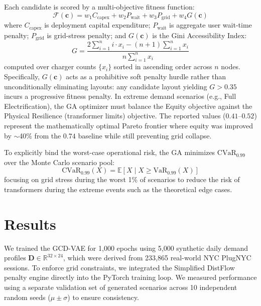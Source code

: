\documentclass[conference]{IEEEtran}
\begin{document}
Each candidate is scored by a multi-objective fitness function:
\begin{equation}
    \mathcal{F}(\mathbf{c}) = w_1 C_{\text{capex}} + w_2 P_{\text{wait}} + w_3 P_{\text{grid}} + w_4 G(\mathbf{c})
    \label{eq:fitness}
\end{equation}
where $C_{\text{capex}}$ is deployment capital expenditure; $P_{\text{wait}}$ is aggregate user wait-time penalty; $P_{\text{grid}}$ is grid-stress penalty; and $G(\mathbf{c})$ is the Gini Accessibility Index:
\begin{equation}
    G = \frac{2\sum_{i=1}^{n} i \cdot x_i - (n+1)\sum_{i=1}^{n} x_i}{n \sum_{i=1}^{n} x_i}
    \label{eq:gini}
\end{equation}
computed over charger counts $\{x_i\}$ sorted in ascending order across $n$ nodes. 
Specifically, $G(\mathbf{c})$ acts as a prohibitive soft penalty hurdle rather than unconditionally eliminating layouts: any candidate layout yielding $G > 0.35$ incurs a progressive fitness penalty. In extreme demand scenarios (e.g., Full Electrification), the GA optimizer must balance the Equity objective against the Physical Resilience (transformer limits) objective. The reported values ($0.41$--$0.52$) represent the mathematically optimal Pareto frontier where equity was improved by $\sim$40\% from the $0.74$ baseline while still preventing grid collapse.

To explicitly bind the worst-case operational risk, the GA minimizes $\mathrm{CVaR}_{0.99}$ over the Monte Carlo scenario pool:
\begin{equation}
    \mathrm{CVaR}_{0.99}(X) = \mathbb{E}\left[X \mid X \geq \mathrm{VaR}_{0.99}(X)\right]
\end{equation}
focusing on grid stress during the worst 1\% of scenarios to reduce the risk of transformers during the extreme events such as the theoretical edge cases.

\section{Results}

We trained the GCD-VAE for 1,000 epochs using 5,000 synthetic daily demand profiles $\mathbf{D} \in \mathbb{R}^{32 \times 24}$, which were derived from 233,865 real-world NYC PlugNYC sessions. To enforce grid constraints, we integrated the Simplified DistFlow penalty engine directly into the PyTorch training loop. We measured performance using a separate validation set of generated scenarios across 10 independent random seeds ($\mu \pm \sigma$) to ensure consistency.
\end{document}
